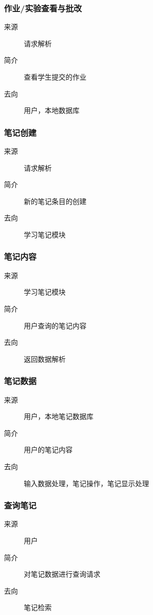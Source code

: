 \subsubsection{作业/实验查看与批改}
\begin{description}
  \item[来源]请求解析
  \item[简介]查看学生提交的作业
  \item[去向]用户，本地数据库
\end{description}

\subsubsection{笔记创建}
\begin{description}
  \item[来源]请求解析
  \item[简介]新的笔记条目的创建
  \item[去向]学习笔记模块
\end{description}


\subsubsection{笔记内容}
\begin{description}
  \item[来源]学习笔记模块
\item[简介]用户查询的笔记内容
\item[去向]返回数据解析
\end{description}




\subsubsection{笔记数据}
\begin{description}
  \item[来源]用户，本地笔记数据库
\item[简介]用户的笔记内容
\item[去向]输入数据处理，笔记操作，笔记显示处理
\end{description}


\subsubsection{查询笔记}
\begin{description}
  \item[来源]用户
\item[简介]对笔记数据进行查询请求
\item[去向]笔记检索
\end{description}


